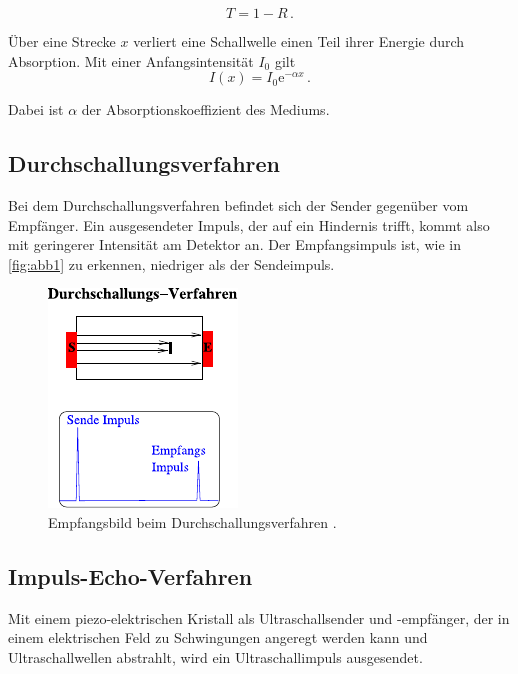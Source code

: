 \begin{equation}
    T = 1 - R\, .  %
    \label{eq:transmisskoeff}
\end{equation}


Über eine Strecke $x$ verliert eine Schallwelle einen Teil ihrer
Energie durch Absorption. Mit einer Anfangsintensität $I_0$ gilt %
\begin{equation}
    I(x) = I_0 \mathrm{e}^{-\alpha x} \,.
\end{equation}

Dabei ist $\alpha$ der Absorptionskoeffizient des Mediums.

\subsection{Durchschallungsverfahren}

Bei dem Durchschallungsverfahren befindet sich der Sender gegenüber
vom Empfänger.
Ein ausgesendeter Impuls, der auf ein Hindernis trifft, kommt
also mit geringerer Intensität am Detektor an.          %
Der Empfangsimpuls ist, wie in \autoref{fig:abb1} zu erkennen,%
niedriger als der Sendeimpuls.

\begin{figure}
    \centering
    \includegraphics{figures/abb1.pdf}
    \caption{Empfangsbild beim Durchschallungsverfahren \cite{ap06}.}
    \label{fig:abb1}
\end{figure}

\subsection{Impuls-Echo-Verfahren}

Mit einem piezo-elektrischen Kristall als Ultraschallsender und
-empfänger, der in einem elektrischen Feld zu Schwingungen
angeregt werden kann und Ultraschallwellen abstrahlt, wird ein
Ultraschallimpuls ausgesendet. \\

